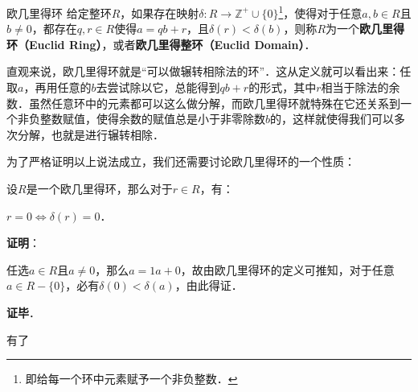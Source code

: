 

\begin{definition}{欧几里得环}
给定整环$R$，如果存在映射$\delta:R\to\mathbb{Z}^+\cup\{0\}$\footnote{即给每一个环中元素赋予一个非负整数．}，使得对于任意$a, b\in R$且$b\not=0$，都存在$q, r\in R$使得$a=qb+r$，且$\delta(r)<\delta(b)$，则称$R$为一个\textbf{欧几里得环（Euclid Ring）}，或者\textbf{欧几里得整环（Euclid Domain）}．
\end{definition}

直观来说，欧几里得环就是“可以做辗转相除法的环”．这从定义就可以看出来：任取$a$，再用任意的$b$去尝试除以它，总能得到$qb+r$的形式，其中$r$相当于除法的余数．虽然任意环中的元素都可以这么做分解，而欧几里得环就特殊在它还关系到一个非负整数赋值，使得余数的赋值总是小于非零除数$b$的，这样就使得我们可以多次分解，也就是进行辗转相除．

为了严格证明以上说法成立，我们还需要讨论欧几里得环的一个性质：

\begin{theorem}{}\label{EuRing_the1}
设$R$是一个欧几里得环，那么对于$r\in R$，有：

$r=0\iff \delta(r)=0$．
\end{theorem}

\textbf{证明}：

任选$a\in R$且$a\not=0$，那么$a=1a+0$，故由欧几里得环的定义可推知，对于任意$a\in R-\{0\}$，必有$\delta(0)<\delta(a)$，由此得证．

\textbf{证毕}．

有了



